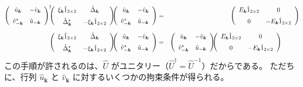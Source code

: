 \documentclass[uplatex,a4j,12pt,dvipdfmx]{jsarticle}
\begin{document}
\begin{eqnarray}
	\left(
	\begin{array}{cc}
		\hat{u}_{\bm{k}}       & - \hat{v}_{\bm{k}} \\[2mm]
		\hat{v}_{- \bm{k}}^{*} & \hat{u}_{-\bm{k}}
	\end{array}
	\right)^{\dagger}
	\!\!\!
	\left(
	\begin{array}{cc}
			\xi_{\bm{k}} \hat{1}_{2 \times 2} & \hat{\Delta}_{\bm{k}}               \\[2mm]
			\hat{\Delta}^{*}_{\bm{k}}         & - \xi_{\bm{k}} \hat{1}_{2 \times 2}
		\end{array}
	\right)
	\!\!\!
	\left(
	\begin{array}{cc}
			\hat{u}_{\bm{k}}       & - \hat{v}_{\bm{k}} \\[2mm]
			\hat{v}_{- \bm{k}}^{*} & \hat{u}_{-\bm{k}}
		\end{array}
	\right)
	&=&
	\left(
	\begin{array}{cc}
			E_{\bm{k}} \hat{1}_{2 \times 2} & 0                                  \\[2mm]
			0                                & - E_{\bm{k}} \hat{1}_{2 \times 2}
		\end{array}
	\right)
	\\[2mm]
	\left(
	\begin{array}{cc}
			\xi_{\bm{k}} \hat{1}_{2 \times 2} & \hat{\Delta}_{\bm{k}}               \\[2mm]
			\hat{\Delta}^{*}_{\bm{k}}         & - \xi_{\bm{k}} \hat{1}_{2 \times 2}
		\end{array}
	\right)
	\!\!\!
	\left(
	\begin{array}{cc}
			\hat{u}_{\bm{k}}       & - \hat{v}_{\bm{k}} \\[2mm]
			\hat{v}_{- \bm{k}}^{*} & \hat{u}_{-\bm{k}}
		\end{array}
	\right)
	&=&
	\left(
	\begin{array}{cc}
			\hat{u}_{\bm{k}}       & - \hat{v}_{\bm{k}} \\[2mm]
			\hat{v}_{- \bm{k}}^{*} & \hat{u}_{-\bm{k}}
		\end{array}
	\right)
	\!\!\!
	\left(
	\begin{array}{cc}
			E_{\bm{k}} \hat{1}_{2 \times 2} & 0                                  \\[2mm]
			0                                & - E_{\bm{k}} \hat{1}_{2 \times 2}
		\end{array}
	\right)
	\hspace{10mm}
\end{eqnarray}
%
この手順が許されるのは、$\hat{U}$ がユニタリー（$\hat{U}^{\dagger} = \hat{U}^{-1}$）だからである。
ただちに、行列 $\hat{u}_{\bm{k}}$ と $\hat{v}_{\bm{k}}$ に対するいくつかの拘束条件が得られる。
\end{document}
